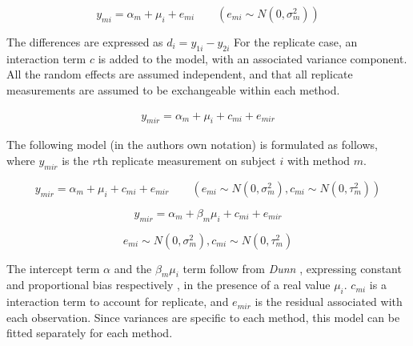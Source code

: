 \documentclass[12pt, a4paper]{report}
\theoremstyle{plain}
\theoremstyle{definition}
\theoremstyle{remark}
\begin{document}
	\begin{equation}
	y_{mi}  = \alpha_{m} + \mu_{i} + e_{mi} \qquad ( e_{mi} \sim
	N(0,\sigma^{2}_{m}))
	\end{equation}
	
	
	
	
	The differences are expressed as $d_{i} = y_{1i} - y_{2i}$ For the
	replicate case, an interaction term $c$ is added to the model,
	with an associated variance component. 
	All the random effects are
	assumed independent, and that all replicate measurements are
	assumed to be exchangeable within each method.
	
	\begin{eqnarray}
	y_{mir}  = \alpha_{m} + \mu_{i} + c_{mi} + e_{mir} 
	\end{eqnarray}
	
	
	
	The following model (in the authors own notation) is
	formulated as follows, where $y_{mir}$ is the $r$th replicate
	measurement on subject $i$ with method $m$.
	
	{
		
		\begin{equation}
		y_{mir}  = \alpha_{m} + \mu_{i} + c_{mi} + e_{mir} \qquad ( e_{mi}
		\sim N(0,\sigma^{2}_{m}), c_{mi} \sim N(0,\tau^{2}_{m}))
		\end{equation}
		
		
		\begin{equation}
		y_{mir}  = \alpha_{m} + \beta_{m}\mu_{i} + c_{mi} + e_{mir} 
		\end{equation}
	}
	
	{
		
		\[ e_{mi} \sim N(0,\sigma^{2}_{m}), c_{mi} \sim N(0,\tau^{2}_{m})\]
	}
	
	
	The intercept term $\alpha$ and the $\beta_{m}\mu_{i}$ term follow
	from \textit{Dunn} \cite{DunnSEME}, expressing constant and proportional bias
	respectively , in the presence of a real value $\mu_{i}.$
	$c_{mi}$ is a interaction term to account for replicate, and
	$e_{mir}$ is the residual associated with each observation.
	Since variances are specific to each method, this model can be
	fitted separately for each method.
	
	
	
	
\end{document}
